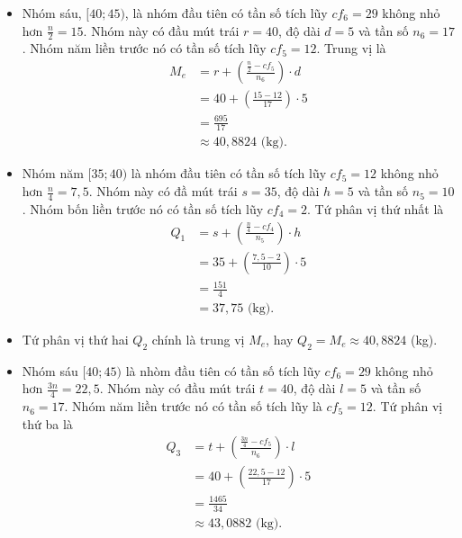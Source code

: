 \documentclass[
  letterpaper,
  DIV=11,
  numbers=noendperiod]{scrartcl}
\providecommand{\tightlist}{%
  \setlength{\itemsep}{0pt}\setlength{\parskip}{0pt}}\usepackage{longtable,booktabs,array}
\begin{document}
\begin{itemize}
\tightlist
\item
  Nhóm sáu, \([40;45)\), là nhóm đầu tiên có tần số tích lũy \(cf_6=29\)
  không nhỏ hơn \(\frac{n}{2}=15\). Nhóm này có đầu mút trái \(r=40\),
  độ dài \(d=5\) và tần số \(n_6=17\). Nhóm năm liền trước nó có tần số
  tích lũy \(cf_5=12\). Trung vị là \begin{align*}
  M_e
    & = r + \left(\frac{\frac{n}{2}-cf_5}{n_6}\right)\cdot d \\
    & = 40 + \left(\frac{15-12}{17}\right)\cdot 5 \\
    & = \frac{695}{17} \\
    & \approx 40,8824 \text{ (kg).}
  \end{align*}
\end{itemize}

\begin{itemize}
\item
  Nhóm năm \([35;40)\) là nhóm đầu tiên có tần số tích lũy \(cf_5=12\)
  không nhỏ hơn \(\frac{n}{4}=7,5\). Nhóm này có đầ mút trái \(s=35\),
  độ dài \(h=5\) và tần số \(n_5=10\). Nhóm bốn liền trước nó có tần số
  tích lũy \(cf_4=2\). Tứ phân vị thứ nhất là \begin{align*}
  Q_1
    & = s + \left( \frac{\frac{n}{4}-cf_4}{n_5}\right)\cdot h \\
    & = 35 + \left(\frac{7,5-2}{10}\right)\cdot 5 \\
    & = \frac{151}{4} \\
    & = 37,75 \text{ (kg).}
  \end{align*}
\item
  Tứ phân vị thứ hai \(Q_2\) chính là trung vị \(M_e\), hay
  \(Q_2=M_e \approx 40,8824\) (kg).
\end{itemize}

\begin{itemize}
\tightlist
\item
  Nhóm sáu \([40;45)\) là nhòm đầu tiên có tần số tích lũy \(cf_6=29\)
  không nhỏ hơn \(\frac{3n}{4}=22,5\). Nhóm này có đầu mút trái
  \(t=40\), độ dài \(l=5\) và tần số \(n_6=17\). Nhóm năm liền trước nó
  có tần số tích lũy là \(cf_5=12\). Tứ phân vị thứ ba là \begin{align*}
  Q_3
    & = t + \left(\frac{\frac{3n}{4}-cf_5}{n_6}\right)\cdot l \\
    & = 40 +\left(\frac{22,5-12}{17}\right) \cdot 5 \\
    & = \frac{1465}{34} \\
    & \approx 43,0882 \text{ (kg).} 
  \end{align*}
\end{itemize}
\end{document}
